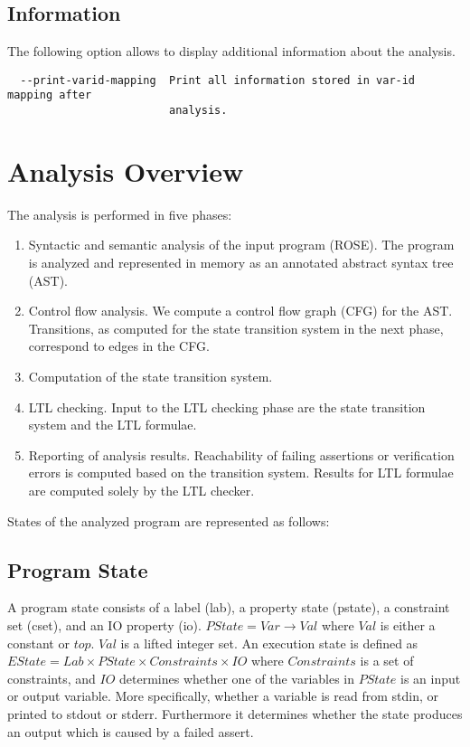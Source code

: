 \documentclass[natbib]{article}
\begin{document}
\subsection{Information}
The following option allows to display additional information about the analysis.
\begin{verbatim}
  --print-varid-mapping  Print all information stored in var-id mapping after 
                         analysis.
\end{verbatim}


\section{Analysis Overview}

The analysis is performed in five phases:

\begin{enumerate}
\item Syntactic and semantic analysis of the input program (ROSE). The program is analyzed and represented in memory as an annotated abstract syntax tree (AST).
\item Control flow analysis. We compute a control flow graph (CFG) for the AST. Transitions, as computed for the state transition system in the next phase, correspond to edges in the CFG.
\item Computation of the state transition system.
\item LTL checking. Input to the LTL checking phase are the state transition system and the LTL formulae.
\item Reporting of analysis results. Reachability of failing assertions or verification errors is computed based 
on the transition system. Results for LTL formulae are computed solely by the LTL checker.
\end{enumerate}

\noindent States of the analyzed program are represented as follows:

\subsection{Program State}

A program state consists of a label (lab), a property state (pstate),
a constraint set (cset), and an IO property (io). $PState = Var
\rightarrow Val$ where $Val$ is either a constant or $top$. $Val$ is a
lifted integer set. An execution state is defined as $EState = Lab \times
PState \times Constraints \times IO$ where $Constraints$ is a set of
constraints, and $IO$ determines whether one of the variables in $PState$ is
an input or output variable. More specifically, whether a variable is
read from stdin, or printed to stdout or stderr. Furthermore it
determines whether the state produces an output which is caused by a
failed assert.



\end{document}
